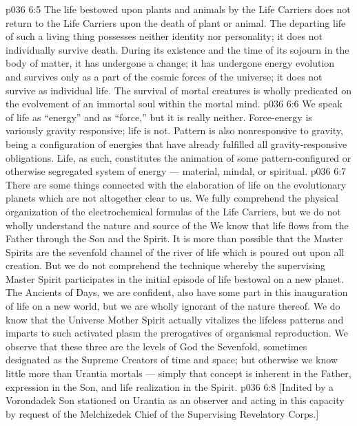 \vs p036 6:5 The life bestowed upon plants and animals by the Life Carriers does not return to the Life Carriers upon the death of plant or animal. The departing life of such a living thing possesses neither identity nor personality; it does not individually survive death. During its existence and the time of its sojourn in the body of matter, it has undergone a change; it has undergone energy evolution and survives only as a part of the cosmic forces of the universe; it does not survive as individual life. The survival of mortal creatures is wholly predicated on the evolvement of an immortal soul within the mortal mind.
\vs p036 6:6 \pc We speak of life as “energy” and as “force,” but it is really neither. Force\hyp{}energy is variously gravity responsive; life is not. Pattern is also nonresponsive to gravity, being a configuration of energies that have already fulfilled all gravity\hyp{}responsive obligations. Life, as such, constitutes the animation of some pattern\hyp{}configured or otherwise segregated system of energy --- material, mindal, or spiritual.
\vs p036 6:7 \pc There are some things connected with the elaboration of life on the evolutionary planets which are not altogether clear to us. We fully comprehend the physical organization of the electrochemical formulas of the Life Carriers, but we do not wholly understand the nature and source of the  We know that life flows from the Father through the Son and  the Spirit. It is more than possible that the Master Spirits are the sevenfold channel of the river of life which is poured out upon all creation. But we do not comprehend the technique whereby the supervising Master Spirit participates in the initial episode of life bestowal on a new planet. The Ancients of Days, we are confident, also have some part in this inauguration of life on a new world, but we are wholly ignorant of the nature thereof. We do know that the Universe Mother Spirit actually vitalizes the lifeless patterns and imparts to such activated plasm the prerogatives of organismal reproduction. We observe that these three are the levels of God the Sevenfold, sometimes designated as the Supreme Creators of time and space; but otherwise we know little more than Urantia mortals --- simply that concept is inherent in the Father, expression in the Son, and life realization in the Spirit.
\vsetoff
\vs p036 6:8 [Indited by a Vorondadek Son stationed on Urantia as an observer and acting in this capacity by request of the Melchizedek Chief of the Supervising Revelatory Corps.]
\quizlink
